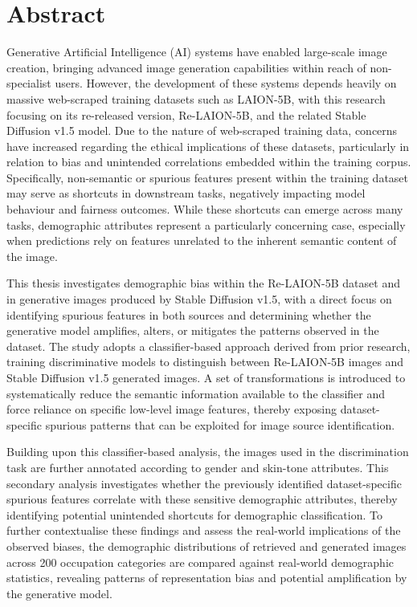 \chapter*{Abstract}

Generative Artificial Intelligence (AI) systems have enabled large-scale image creation, bringing advanced image generation capabilities within reach of non-specialist users. However, the development of these systems depends heavily on massive web-scraped training datasets such as LAION-5B, with this research focusing on its re-released version, Re-LAION-5B, and the related Stable Diffusion v1.5 model. Due to the nature of web-scraped training data, concerns have increased regarding the ethical implications of these datasets, particularly in relation to bias and unintended correlations embedded within the training corpus. Specifically, non-semantic or spurious features present within the training dataset may serve as shortcuts in downstream tasks, negatively impacting model behaviour and fairness outcomes. While these shortcuts can emerge across many tasks, demographic attributes represent a particularly concerning case, especially when predictions rely on features unrelated to the inherent semantic content of the image.

This thesis investigates demographic bias within the Re-LAION-5B dataset and in generative images produced by Stable Diffusion v1.5, with a direct focus on identifying spurious features in both sources and determining whether the generative model amplifies, alters, or mitigates the patterns observed in the dataset. The study adopts a classifier-based approach derived from prior research, training discriminative models to distinguish between Re-LAION-5B images and Stable Diffusion v1.5 generated images. A set of transformations is introduced to systematically reduce the semantic information available to the classifier and force reliance on specific low-level image features, thereby exposing dataset-specific spurious patterns that can be exploited for image source identification.

Building upon this classifier-based analysis, the images used in the discrimination task are further annotated according to gender and skin-tone attributes. This secondary analysis investigates whether the previously identified dataset-specific spurious features correlate with these sensitive demographic attributes, thereby identifying potential unintended shortcuts for demographic classification. To further contextualise these findings and assess the real-world implications of the observed biases, the demographic distributions of retrieved and generated images across 200 occupation categories are compared against real-world demographic statistics, revealing patterns of representation bias and potential amplification by the generative model.

